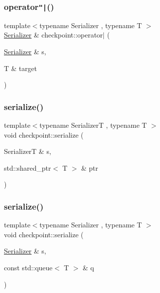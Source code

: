 \mbox{\label{namespacecheckpoint_a5c9a1c4d05ec6880270c9a6d0dded825}} 
\subsubsection{\texorpdfstring{operator\texttt{"|}()}{operator|()}}
{\footnotesize\ttfamily template$<$typename Serializer , typename T $>$ \\
\hyperlink{structcheckpoint_1_1_serializer}{Serializer} \& checkpoint\+::operator$\vert$ (\begin{DoxyParamCaption}\item[{\hyperlink{structcheckpoint_1_1_serializer}{Serializer} \&}]{s,  }\item[{T \&}]{target }\end{DoxyParamCaption})\hspace{0.3cm}{\ttfamily [inline]}}

\mbox{\label{namespacecheckpoint_a200b46814a9fcae10246577315cc1fa7}} 
\subsubsection{\texorpdfstring{serialize()}{serialize()}\hspace{0.1cm}{\footnotesize\ttfamily [1/25]}}
{\footnotesize\ttfamily template$<$typename SerializerT , typename T $>$ \\
void checkpoint\+::serialize (\begin{DoxyParamCaption}\item[{SerializerT \&}]{s,  }\item[{std\+::shared\+\_\+ptr$<$ T $>$ \&}]{ptr }\end{DoxyParamCaption})}

\mbox{\label{namespacecheckpoint_a5621e2549443d76acad6c83fdfdcbeab}} 
\subsubsection{\texorpdfstring{serialize()}{serialize()}\hspace{0.1cm}{\footnotesize\ttfamily [2/25]}}
{\footnotesize\ttfamily template$<$typename Serializer , typename T $>$ \\
void checkpoint\+::serialize (\begin{DoxyParamCaption}\item[{\hyperlink{structcheckpoint_1_1_serializer}{Serializer} \&}]{s,  }\item[{const std\+::queue$<$ T $>$ \&}]{q }\end{DoxyParamCaption})}

